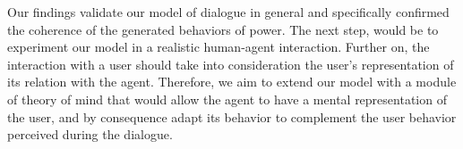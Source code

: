 \documentclass{llncs}
\begin{document}
	Our findings validate our model of dialogue in general and specifically confirmed the coherence of the generated behaviors of power. 
	The next step, would be to experiment our model in a realistic human-agent interaction.
	Further on, the interaction with a user should take into consideration the user's representation of its relation with the agent. Therefore, we aim to extend our model with a module of theory of mind that would allow the agent to have a mental representation of the user, and by consequence adapt its behavior to complement the user behavior perceived during the dialogue.
	
	
		

	
	\vskip 4pt
	
	\small{}



	
\end{document}
